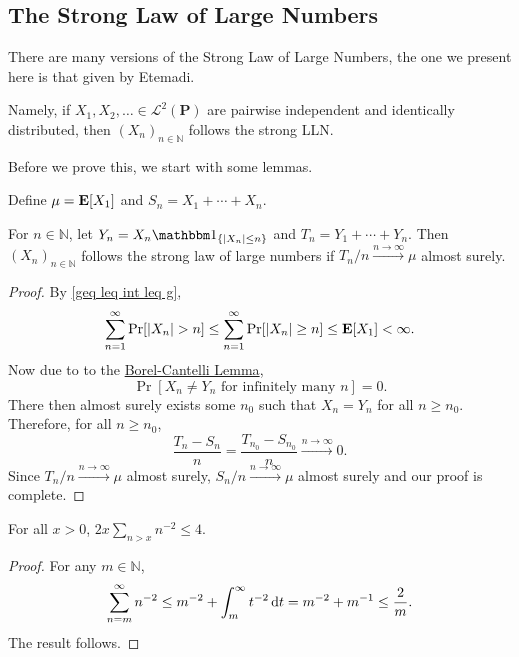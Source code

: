 \subsection{The Strong Law of Large Numbers}

There are many versions of the Strong Law of Large Numbers, the one we present here is that given by Etemadi.

Namely, if $X_1,X_2,\ldots\in\mathcal{L}^2(\textbf{P})$ are pairwise independent and identically distributed, then $(X_n)_{n\in\mathbb{N}}$ follows the strong LLN.

Before we prove this, we start with some lemmas.

Define $\mu=\textbf{E}[X_1]$ and $S_n=X_1+\cdots+X_n$.

\begin{lemma}
\label{prlem1etem}
    For $n\in\mathbb{N}$, let $Y_n=X_n\indic_{\{|X_n|\leq n\}}$ and $T_n=Y_1+\cdots+Y_n$. Then $(X_n)_{n\in\mathbb{N}}$ follows the strong law of large numbers if $T_n/n\xrightarrow{n\to\infty}\mu$ almost surely.
\end{lemma}
\begin{proof}
    By \cref{geq leq int leq g}, $$\sum_{n=1}^\infty \Pr[|X_n|> n]\leq\sum_{n=1}^\infty \Pr[|X_n|\geq n]\leq\expec[X_1]<\infty.$$ Now due to to the \hyperref[borelCantelliLemma]{Borel-Cantelli Lemma},
    $$\Pr[X_n\neq Y_n\text{ for infinitely many $n$}]=0.$$
    There then almost surely exists some $n_0$ such that $X_n=Y_n$ for all $n\geq n_0$. Therefore, for all $n\geq n_0$,
    $$\frac{T_n-S_n}{n} = \frac{T_{n_0}-S_{n_0}}{n}\xrightarrow{n\to\infty}0.$$
    Since $T_n/n\xrightarrow{n\to\infty}\mu$ almost surely, $S_n/n\xrightarrow{n\to\infty}\mu$ almost surely and our proof is complete.
\end{proof}

\begin{lemma}
    For all $x>0$, $2x\sum_{n>x}n^{-2}\leq 4$.
\end{lemma}
\begin{proof}
    For any $m\in\mathbb{N}$,
    $$\sum_{n=m}^\infty n^{-2} \leq m^{-2} + \int_m^\infty t^{-2}\operatorname{d}\!{t} = m^{-2} + m^{-1} \leq \frac{2}{m}.$$
    The result follows.
\end{proof}

